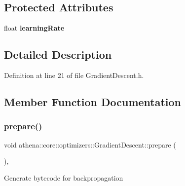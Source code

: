 \subsection*{Protected Attributes}
\begin{DoxyCompactItemize}
\item 
\mbox{\label{classathena_1_1core_1_1optimizers_1_1_gradient_descent_a40fd65d38f6804e2e8c7109f7cd27e67}} 
float {\bfseries learning\+Rate}
\end{DoxyCompactItemize}


\subsection{Detailed Description}


Definition at line 21 of file Gradient\+Descent.\+h.



\subsection{Member Function Documentation}
\mbox{\label{classathena_1_1core_1_1optimizers_1_1_gradient_descent_ab9ecd3b02a82c86bfaaa3d93789d2d5a}} 
\subsubsection{\texorpdfstring{prepare()}{prepare()}}
{\footnotesize\ttfamily void athena\+::core\+::optimizers\+::\+Gradient\+Descent\+::prepare (\begin{DoxyParamCaption}{ }\end{DoxyParamCaption})\hspace{0.3cm}{\ttfamily [override]}, {\ttfamily [virtual]}}

Generate bytecode for backpropagation 

